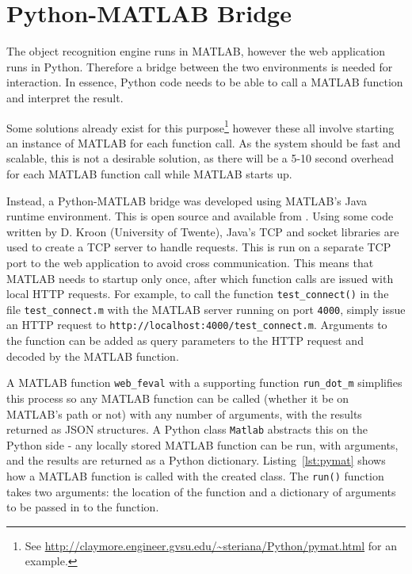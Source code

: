 \documentclass[11pt, onecolumn, a4paper, final]{report} %
\begin{document}
\section{Python-MATLAB Bridge}
\label{sec:bridge}
The object recognition engine runs in MATLAB, however the web application runs in Python. Therefore a bridge between the two environments is needed for interaction. In essence, Python code needs to be able to call a MATLAB function and interpret the result.

Some solutions already exist for this purpose\footnote{See \url{http://claymore.engineer.gvsu.edu/~steriana/Python/pymat.html} for an example.} however these all involve starting an instance of MATLAB for each function call. As the system should be fast and scalable, this is not a desirable solution, as there will be a 5-10 second overhead for each MATLAB function call while MATLAB starts up.

\lstset{language=Matlab}
Instead, a Python-MATLAB bridge was developed using MATLAB's Java runtime environment. This is open source and available from \cite{pymatbridge}. Using some code written by D. Kroon (University of Twente), Java's TCP and socket libraries are used to create a TCP server to handle requests. This is run on a separate TCP port to the web application to avoid cross communication. This means that MATLAB needs to startup only once, after which function calls are issued with local HTTP requests. For example, to call the function \lstinline!test_connect()! in the file \lstinline!test_connect.m! with the MATLAB server running on port \lstinline!4000!, simply issue an HTTP request to \lstinline!http://localhost:4000/test_connect.m!. Arguments to the function can be added as query parameters to the HTTP request and decoded by the MATLAB function.

A MATLAB function \lstinline!web_feval! with a supporting function \lstinline!run_dot_m! simplifies this process so any MATLAB function can be called (whether it be on MATLAB's path or not) with any number of arguments, with the results returned as JSON structures. A Python class \lstinline!Matlab! abstracts this on the Python side - any locally stored MATLAB function can be run, with arguments, and the results are returned as a Python dictionary. Listing~\ref{lst:pymat} shows how a MATLAB function is called with the created class. The \lstinline!run()! function takes two arguments: the location of the function and a dictionary of arguments to be passed in to the function.
 
\end{document}
